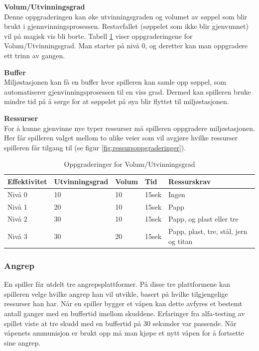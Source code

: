 \begin{description}
	\item \textbf{Volum/Utvinningsgrad}\\
		Denne oppgraderingen kan øke utvinningsgraden og volumet av
søppel som blir brukt i gjennvinningsprosessen. Restavfallet (søppelet
som ikke blir gjenvunnet) vil på magisk vis bli borte. Tabell
\ref{tab:effektivitet} viser oppgraderingene for Volum/Utvinningsgrad.
Man starter på nivå 0, og deretter kan man oppgradere ett trinn av
gangen.
	\item \textbf{Buffer}\\
		Miljøstasjonen kan få en buffer hvor spilleren kan samle opp søppel, som automatiserer gjenvinningsprosessen til en viss grad. Dermed kan spilleren bruke mindre tid på å sørge for at søppelet på øya blir flyttet til miljøstasjonen.
	\item \textbf{Ressurser}\\
		For å kunne gjenvinne nye typer ressurser må spilleren oppgradere miljøstasjonen. Her får spilleren valget mellom to ulike veier som vil avgjøre hvilke ressurser spilleren får tilgang til (se figur \ref{fig:ressursoppgraderinger}).
\end{description}

\begin{table}
	\begin{tabular}[\textwidth]{ l  l  p{3cm}  l  p{4cm} }
		\hline
		\bf{Effektivitet} & \bf{Utvinningsgrad} & \bf{Volum} & \bf{Tid} & \bf{Ressurskrav} \\
		\hline
		Nivå 0 & 10 & 10 & 15sek & Ingen  \\
		Nivå 1 & 20 & 10 & 15sek & Papp \\
		Nivå 2 & 30 & 10 & 15sek & Papp, og plast eller tre \\
		Nivå 3 & 30 & 20 & 15sek & Papp, plast, tre, stål, jern og titan \\
		\hline
	\end{tabular}
	\caption{Oppgraderinger for Volum/Utvinningsgrad}
	\label{tab:effektivitet}
\end{table}


\subsubsection{Angrep}
En spiller får utdelt tre angrepsplattformer. På disse tre plattformene
kan spilleren velge hvilke angrep han vil utvikle, basert på hvilke
tilgjengelige ressurser han har. Når en spiller bygger et våpen kan dette avfyres et bestemt antall ganger med en buffertid imellom skuddene. Erfaringer fra alfa-testing av spillet viste at tre skudd med en buffertid på 30 sekunder var passende. Når våpenets ammunisjon er brukt opp må man kjøpe et nytt våpen for å fortsette sine angrep. 

